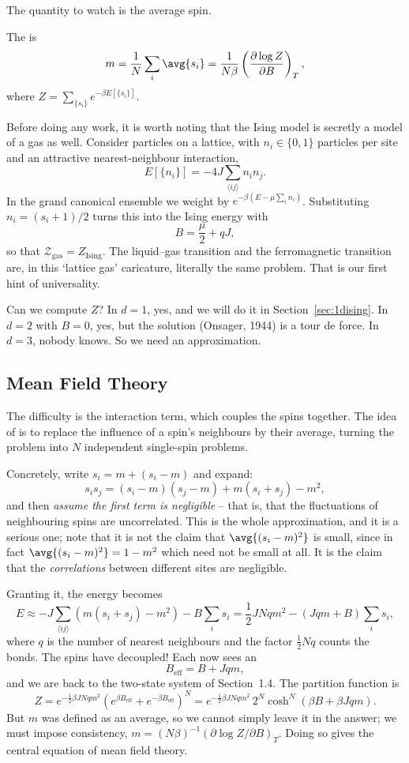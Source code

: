 The quantity to watch is the average spin.

\begin{definition}[Magnetisation]
	The  is
	$$
	m = \frac 1N \sum_i \avg{s_i} = \frac{1}{N\beta}\left(\frac{\partial \log Z}{\partial B}\right)_T,
	$$
	where $Z = \sum_{\{s_i\}}e^{-\beta E[\{s_i\}]}$.
\end{definition}

Before doing any work, it is worth noting that the Ising model is secretly a model of a gas as well. Consider particles on a lattice, with $n_i \in \{0,1\}$ particles per site and an attractive nearest-neighbour interaction,
$$
E[\{n_i\}] = -4J\sum_{\langle ij\rangle}n_i n_j.
$$
In the grand canonical ensemble we weight by $e^{-\beta(E - \mu\sum_i n_i)}$. Substituting $n_i = (s_i+1)/2$ turns this into the Ising energy with
$$
B = \frac\mu2 + qJ,
$$
so that $\mathcal Z_{\mathrm{gas}} = Z_{\mathrm{Ising}}$. The liquid--gas transition and the ferromagnetic transition are, in this `lattice gas' caricature, literally the same problem. That is our first hint of universality.

Can we compute $Z$? In $d=1$, yes, and we will do it in Section~\ref{sec:1dising}. In $d = 2$ with $B = 0$, yes, but the solution (Onsager, 1944) is a tour de force. In $d = 3$, nobody knows. So we need an approximation.

\subsection{Mean Field Theory}\label{sec:meanfield}

The difficulty is the interaction term, which couples the spins together. The idea of  is to replace the influence of a spin's neighbours by their average, turning the problem into $N$ independent single-spin problems.

Concretely, write $s_i = m + (s_i - m)$ and expand:
$$
s_i s_j = (s_i - m)(s_j - m) + m(s_i + s_j) - m^2,
$$
and then \emph{assume the first term is negligible} -- that is, that the fluctuations of neighbouring spins are uncorrelated. This is the whole approximation, and it is a serious one; note that it is not the claim that $\avg{(s_i-m)^2}$ is small, since in fact $\avg{(s_i-m)^2} = 1 - m^2$ which need not be small at all. It is the claim that the \emph{correlations} between different sites are negligible.

Granting it, the energy becomes
$$
E \approx -J\sum_{\langle ij\rangle}\left(m(s_i+s_j) - m^2\right) - B\sum_i s_i = \frac 12 JNqm^2 - (Jqm + B)\sum_i s_i,
$$
where $q$ is the number of nearest neighbours and the factor $\tfrac12 Nq$ counts the bonds. The spins have decoupled! Each now sees an 
$$
B_{\mathrm{eff}} = B + Jqm,
$$
and we are back to the two-state system of Section~1.4. The partition function is
$$
Z = e^{-\frac 12\beta JNqm^2}\left(e^{\beta B_{\mathrm{eff}}}+e^{-\beta B_{\mathrm{eff}}}\right)^N = e^{-\frac 12 \beta JNqm^2}\,2^N\cosh^N(\beta B + \beta Jqm).
$$
But $m$ was defined as an average, so we cannot simply leave it in the answer; we must impose consistency, $m = (N\beta)^{-1}(\partial\log Z/\partial B)_T$. Doing so gives the central equation of mean field theory.

